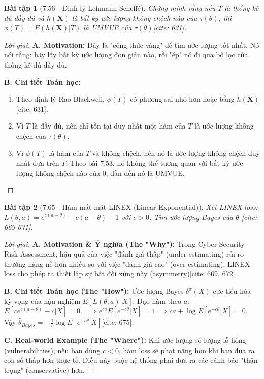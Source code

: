 \documentclass[8pt,a4paper]{article}
\newtheorem{exercise}{Bài tập}
\newenvironment{solution}{\begin{proof}[Lời giải]}{\end{proof}}
\begin{document}
\begin{exercise}[7.56 - Định lý Lehmann-Scheffé]
Chứng minh rằng nếu $T$ là thống kê đủ đầy đủ và $h(\mathbf{X})$ là bất kỳ ước lượng không chệch nào của $\tau(\theta)$, thì $\phi(T) = E(h(\mathbf{X})|T)$ là UMVUE của $\tau(\theta)$[cite: 631].
\end{exercise}

\begin{solution}
\textbf{A. Motivation:} Đây là "công thức vàng" để tìm ước lượng tốt nhất. Nó nói rằng: hãy lấy bất kỳ ước lượng đơn giản nào, rồi "ép" nó đi qua bộ lọc của thống kê đủ đầy đủ.

\textbf{B. Chi tiết Toán học:}
\begin{enumerate}
    \item Theo định lý Rao-Blackwell, $\phi(T)$ có phương sai nhỏ hơn hoặc bằng $h(\mathbf{X})$[cite: 631].
    \item Vì $T$ là đầy đủ, nên chỉ tồn tại duy nhất một hàm của $T$ là ước lượng không chệch của $\tau(\theta)$.
    \item Vì $\phi(T)$ là hàm của $T$ và không chệch, nên nó là ước lượng không chệch duy nhất dựa trên $T$. Theo bài 7.53, nó không thể tương quan với bất kỳ ước lượng không chệch nào của 0, dẫn đến nó là UMVUE.
\end{enumerate}
\end{solution}

\begin{exercise}[7.65 - Hàm mất mát LINEX (Linear-Exponential)]
Xét LINEX loss: $L(\theta, a) = e^{c(a-\theta)} - c(a-\theta) - 1$ với $c > 0$. Tìm ước lượng Bayes của $\theta$ [cite: 669-671].
\end{exercise}

\begin{solution}
\textbf{A. Motivation \& Ý nghĩa (The "Why"):} Trong Cyber Security Risk Assessment, hậu quả của việc "đánh giá thấp" (under-estimating) rủi ro thường nặng nề hơn nhiều so với việc "đánh giá cao" (over-estimating). LINEX loss cho phép ta thiết lập sự bất đối xứng này (asymmetry)[cite: 669, 672].



\textbf{B. Chi tiết Toán học (The "How"):}
Ước lượng Bayes $\delta^\pi(X)$ cực tiểu hóa kỳ vọng của hậu nghiệm $E[L(\theta, a)|X]$.
Đạo hàm theo $a$: $E[c e^{c(a-\theta)} - c | X] = 0$.
$\implies e^{ca} E[e^{-c\theta} | X] = 1 \implies ca + \log E[e^{-c\theta} | X] = 0$.
Vậy $\hat{\theta}_{Bayes} = -\frac{1}{c} \log E[e^{-c\theta} | X]$[cite: 675].

\textbf{C. Real-world Example (The "Where"):} Khi ước lượng số lượng lỗ hổng (vulnerabilities), nếu bạn dùng $c < 0$, hàm loss sẽ phạt nặng hơn khi bạn đưa ra con số thấp hơn thực tế. Điều này buộc hệ thống phải đưa ra các cảnh báo "thận trọng" (conservative) hơn.
\end{solution}
\end{document}
